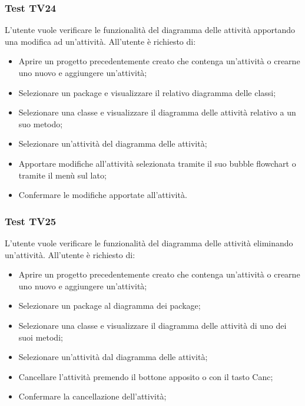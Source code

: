 \documentclass[../PianoDiQualifica.tex]{subfiles}
\begin{document}
	\subsubsection{Test TV24} 
	L'utente vuole verificare le funzionalità del diagramma delle attività apportando una modifica ad un'attività. 
	All'utente è richiesto di: 
	\begin{itemize}  
		\item Aprire un progetto precedentemente creato che contenga un'attività o crearne uno nuovo e aggiungere un'attività;
		\item Selezionare un package e visualizzare il relativo diagramma delle classi; 
		\item Selezionare una classe e visualizzare il diagramma delle attività relativo a un suo metodo; 
		\item Selezionare un'attività del diagramma delle attività; 
		\item Apportare modifiche all'attività selezionata tramite il suo bubble flowchart o tramite il menù sul lato; %
		\item Confermare le modifiche apportate all'attività. 
	\end{itemize} 
	
	
	\subsubsection{Test TV25} 
	L'utente vuole verificare le funzionalità del diagramma delle attività eliminando un'attività. 
	All'utente è richiesto di: 
	\begin{itemize} 
		\item Aprire un progetto precedentemente creato che contenga un'attività o crearne uno nuovo e aggiungere un'attività;
		\item Selezionare un package al diagramma dei package; 
		\item Selezionare una classe e visualizzare il diagramma delle attività di uno dei suoi metodi; 
		\item Selezionare un'attività dal diagramma delle attività; 
		\item Cancellare l'attività premendo il bottone apposito o con il tasto Canc; 
		\item Confermare la cancellazione dell'attività; 
	\end{itemize} 
	
\end{document}
